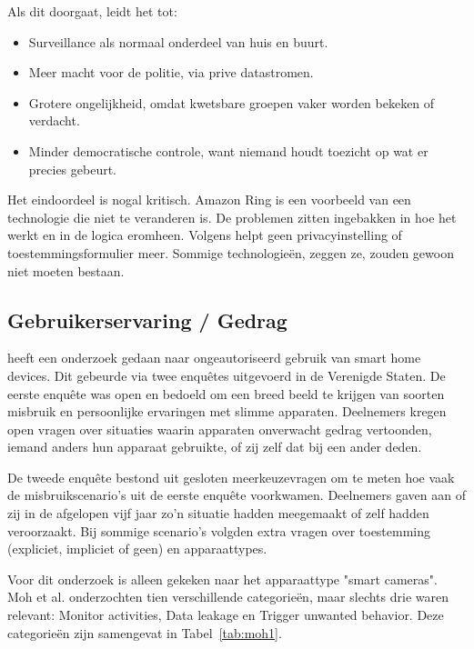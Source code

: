 \documentclass[nonacm, sigconf]{acmart}
\begin{document}
    \noindent Als dit doorgaat, leidt het tot:
    \begin{itemize}
        \item Surveillance als normaal onderdeel van huis en buurt.
        \item Meer macht voor de politie, via prive datastromen.
        \item Grotere ongelijkheid, omdat kwetsbare groepen vaker worden bekeken of verdacht.
        \item Minder democratische controle, want niemand houdt toezicht op wat er precies gebeurt.
    \end{itemize}

    \noindent Het eindoordeel is nogal kritisch.
    Amazon Ring is een voorbeeld van een technologie die niet te veranderen is.
    De problemen zitten ingebakken in hoe het werkt en in de logica eromheen.
    Volgens \citeauthor{selinger2022amazon} helpt geen privacyinstelling of toestemmingsformulier meer.
    Sommige technologieën, zeggen ze, zouden gewoon niet moeten bestaan.

    \subsection{Gebruikerservaring / Gedrag}


    \parencite{moh2023characterizing} heeft een onderzoek gedaan naar ongeautoriseerd gebruik van smart home devices.
    Dit gebeurde via twee enquêtes uitgevoerd in de Verenigde Staten.
    De eerste enquête was open en bedoeld om een breed beeld te krijgen van soorten misbruik en persoonlijke ervaringen met slimme apparaten.
    Deelnemers kregen open vragen over situaties waarin apparaten onverwacht gedrag vertoonden, iemand anders hun apparaat gebruikte, of zij zelf dat bij een ander deden.

    De tweede enquête bestond uit gesloten meerkeuzevragen om te meten hoe vaak de misbruikscenario's uit de eerste enquête voorkwamen.
    Deelnemers gaven aan of zij in de afgelopen vijf jaar zo'n situatie hadden meegemaakt of zelf hadden veroorzaakt.
    Bij sommige scenario's volgden extra vragen over toestemming (expliciet, impliciet of geen) en apparaattypes.

    Voor dit onderzoek is alleen gekeken naar het apparaattype "smart cameras".
    Moh et al. onderzochten tien verschillende categorieën, maar slechts drie waren relevant: Monitor activities, Data leakage en Trigger unwanted behavior.
    Deze categorieën zijn samengevat in Tabel~\ref{tab:moh1}.
\end{document}
